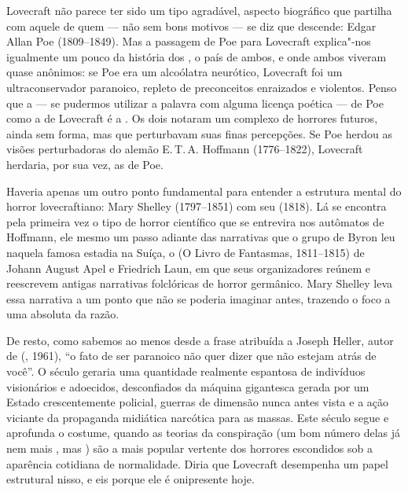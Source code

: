 Lovecraft não parece ter sido um tipo agradável, aspecto biográfico que
partilha com aquele de quem --- não sem bons motivos --- se diz que
descende: Edgar Allan Poe (1809--1849). Mas a passagem de Poe para
Lovecraft explica"-nos igualmente um pouco da história dos , o país de
ambos, e onde ambos viveram quase anônimos: se Poe era um alcoólatra
neurótico, Lovecraft foi um ultraconservador paranoico, repleto de
preconceitos enraizados e violentos. Penso que a {} --- se
pudermos utilizar a palavra com alguma licença poética --- de Poe como a
de Lovecraft é a {}. Os dois notaram um complexo
de horrores futuros, ainda sem forma, mas que perturbavam suas finas
percepções. Se Poe herdou as visões perturbadoras do alemão E.\,T.\,A.
Hoffmann (1776--1822), Lovecraft herdaria, por sua
vez, as de Poe.

Haveria apenas um outro ponto fundamental para entender a estrutura
mental do horror lovecraftiano: Mary Shelley (1797--1851) com seu
{} (1818). Lá se encontra pela primeira vez o tipo de
horror científico que se entrevira nos autômatos de Hoffmann, ele mesmo
um passo adiante das narrativas que o grupo de Byron leu naquela famosa
estadia na Suíça, o {} (O Livro de Fantasmas, 1811--1815)
de Johann August Apel e Friedrich Laun, em que seus organizadores reúnem
e reescrevem antigas narrativas folclóricas de horror germânico. Mary
Shelley leva essa narrativa a um ponto que não se poderia imaginar
antes, trazendo o foco a uma absoluta {} da razão.

De resto, como sabemos ao menos desde a frase atribuída a Joseph Heller,
autor de {} ({}, 1961), ``o fato de ser
paranoico não quer dizer que não estejam atrás de você''. O século 
geraria uma quantidade realmente espantosa de indivíduos visionários e
adoecidos, desconfiados da máquina gigantesca gerada por um Estado
crescentemente policial, guerras de dimensão nunca antes vista e a ação
viciante da propaganda midiática narcótica para as massas. Este século
 segue e aprofunda o costume, quando as teorias da conspiração (um
bom número delas já nem mais {}, mas {}) são a mais popular vertente dos horrores escondidos sob a
aparência cotidiana de normalidade. Diria que Lovecraft desempenha um
papel estrutural nisso, e eis porque ele é onipresente hoje.

